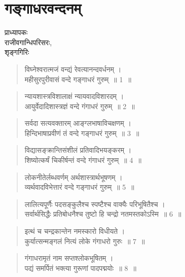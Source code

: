 \chapter{गङ्गाधरवन्दनम्}

\begin{center}
\smallskip

प्राध्यापकः\\
राजीवगान्धिपरिसरः,\\
शृङ्गगिरिः
\addrule
\end{center}

\begin{verse}
विघ्नेश्वरात्मजं वन्द्यं  रेवत्यानन्दवर्धनम् ।\\
महीसुरपुरीवासं वन्दे गङ्गाधरं गुरुम्~॥ 1~॥
\end{verse}

\begin{verse}
न्यायशास्त्रविशालाक्षं न्यायवादविशारदम् ।\\
आयुर्वेदादिशास्त्रज्ञं वन्दे गंगाधरं गुरुम्~॥ 2~॥
\end{verse}

\begin{verse}
सर्वदा सत्यवक्तारम् आङ्ग्लभाषाविचक्षणम् ।\\
हिन्दिभाषाप्रवीणं तं वन्दे गङ्गाधरं गुरुम्~॥ 3~॥
\end{verse}

\begin{verse}
विद्यासङ्क्रान्तिसंशीलं प्रतिवादिभयङ्करम् ।\\
शिष्योत्कर्षं चिकीर्षन्तं वन्दे गंगाधरं गुरुम्~॥ 4~॥
\end{verse}

\begin{verse}
लोकनीतेर्लब्धवर्णम् अर्थशास्त्रार्थभूषणम् ।\\
व्यर्थवादविभेत्तारं वन्दे गङ्गाधरं गुरुम्~॥ 5~॥
\end{verse}

\begin{verse}
लालित्यपूर्णैः पदसङ्कुलैश्च स्पष्टैश्च वाक्यैः परिभूषितैश्च ।\\
सर्वार्थसिद्धैः प्रतिबोधनैश्च तुष्टो हि चन्द्रो नतमस्तकोऽस्मि~॥ 6~॥
\end{verse}

\begin{verse}
इत्थं च चन्द्रकान्तेन नमस्कारो विधीयते ।\\
कुर्यात्सन्मङ्गलं नित्यं लोके गंगाधरो गुरुः~॥ 7~॥
\end{verse}

\begin{verse}
गंगाधरामृतं नाम सप्तश्लोकभूषितम्  ।\\
पद्यं समर्पितं भक्त्या गुरूणां पादपद्मयोः~॥ 8~॥
\end{verse}

\articleend
